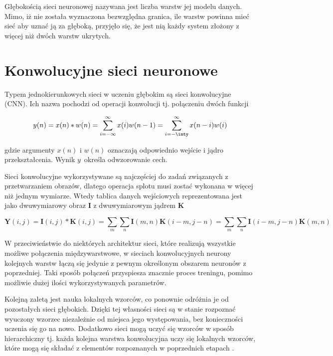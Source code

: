 Głębokością sieci neuronowej nazywana jest liczba warstw jej modelu danych. Mimo, iż nie została wyznaczona bezwzględna granica, ile warstw powinna mieć sieć aby uznać ją za głęboką, przyjęło się, że jest nią każdy system złożony z więcej niż dwóch warstw ukrytych.

\section{Konwolucyjne sieci neuronowe}
\label{roz2.1}

\hspace{0.4cm}
Typem jednokierunkowych sieci w uczeniu głębokim są sieci konwolucyjne (CNN). Ich nazwa pochodzi od operacji konwolucji tj. połączeniu dwóch funkcji

\begin{equation}
    y(n) = x(n) \ast w(n) = \sum_{i=-\infty}^\infty x(i)w(n-1) = \sum_{i=-\inty}^\infty x(n-i)w(i)
\end{equation}

\noindent
gdzie argumenty $x(n)$ i $w(n)$ oznaczają odpowiednio wejście i jądro przekształcenia. Wynik $y$~określa odwzorowanie cech.  \cite{DeepLearning} 


Sieci konwolucyjne wykorzystywane są najczęściej do zadań związanych z przetwarzaniem obrazów, dlatego operacja splotu musi zostać wykonana w więcej niż jednym wymiarze. Wtedy tablica danych wejściowych reprezentowana jest jako dwuwymiarowy obraz \textbf{I} z dwuwymiarowym jądrem \textbf{K}

\begin{equation}
    \textbf{Y}(i,j) = \textbf{I}(i,j) \ast \textbf{K}(i,j) = \sum_m \sum_n \textbf{I}(m,n)\textbf{K}(i-m,j-n) = \sum_m \sum_n \textbf{I}(i-m,j-n)\textbf{K}(m,n)
\end{equation}

W przeciwieństwie do niektórych architektur sieci, które realizują wszystkie możliwe połączenia międzywarstwowe, w sieciach konwolucyjnych neurony kolejnych warstw łączą się jedynie z pewnym określonym obszarem neuronów z poprzedniej. Taki sposób połączeń przyspiesza znacznie proces treningu, pomimo możliwie dużej ilości wykorzystywanych parametrów. 

Kolejną zaletą jest nauka lokalnych wzorców, co ponownie odróżnia je od pozostałych sieci głębokich. Dzięki tej własności sieci są w stanie rozpoznać wyuczony wzorzec niezależnie od miejsca jego występowania, bez konieczności uczenia się go na nowo. Dodatkowo sieci mogą uczyć się wzorców w sposób hierarchiczny tj. każda kolejna warstwa konwolucyjna uczy się lokalnych wzorców, które mogą się składać z elementów rozpoznanych w poprzednich etapach \cite{Python}.

